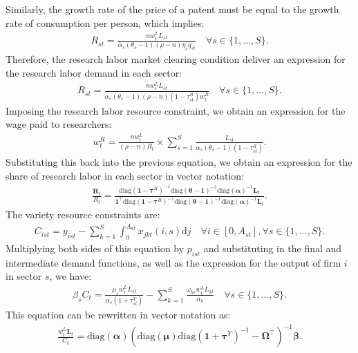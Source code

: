 \documentclass[12pt]{article}
\begin{document}
\clearpage

Similarly, the growth rate of the price of a patent must be equal to the growth rate of consumption per person, which implies:
\begin{align*}
R_{st} = \frac{n w_t^L L_{st}}{\alpha_s (\theta_s - 1) (\rho - n) \eta_s q_{st}} \quad \forall s \in \{1, \ldots, S\}.
\end{align*}
Therefore, the research labor market clearing condition deliver an expression for the research labor demand in each sector:
\begin{align*}
R_{st} = \frac{n w_t^L L_{st}}{\alpha_s (\theta_s - 1) (\rho - n) (1 - \tau_{st}^R) w_t^R} \quad \forall s \in \{1, \ldots, S\}.
\end{align*}
Imposing the research labor resource constraint, we obtain an expression for the wage paid to researchers:
\begin{align*}
w_t^R = \frac{n w_t^L}{(\rho - n) R_t} \times \sum_{s = 1}^S \frac{L_{st}}{\alpha_s (\theta_s - 1) (1 - \tau_{st}^R)}.
\end{align*}
Substituting this back into the previous equation, we obtain an expression for the share of research labor in each sector in vector notation:
\begin{align*}
\frac{\mathbf{R}_t}{R_t} = \frac{\text{diag}(\mathbf{1} - \bm{\tau}^R)^{-1} \text{diag}(\bm{\theta} - \mathbf{1})^{-1} \text{diag}(\bm{\alpha})^{-1} \mathbf{L}_t}{\mathbf{1}^{\top} \text{diag}(\mathbf{1} - \bm{\tau}^R)^{-1} \text{diag}(\bm{\theta} - \mathbf{1})^{-1} \text{diag}(\bm{\alpha})^{-1} \mathbf{L}_t}.
\end{align*}
The variety resource constraints are:
\begin{align*}
C_{ist} = y_{ist} - \sum_{k = 1}^S \int_0^{A_{kt}} x_{jkt}(i, s) \text{d}j \quad \forall i \in [0, A_{st}], \forall s \in \{1, \ldots, S\}.
\end{align*}
Multiplying both sides of this equation by $p_{ist}$ and substituting in the final and intermediate demand functions, as well as the expression for the output of firm $i$ in sector $s$, we have:
\begin{align*}
\beta_s C_t = \frac{\mu_s w_t^L L_{st}}{\alpha_s (1 + \tau_{st}^Y)} - \sum_{k = 1} ^S \frac{\omega_{ks} w_t^L L_{kt}}{\alpha_k} \quad \forall s \in \{1, \ldots, S\}.
\end{align*}
This equation can be rewritten in vector notation as:
\begin{align*}
\frac{w_t^L \mathbf{L}_t}{C_t} = \text{diag}(\bm{\alpha}) (\text{diag}(\bm{\mu}) \text{diag}(\mathbf{1} + \bm{\tau}^Y)^{-1} - \bm{\Omega}^{\top})^{-1} \bm{\beta}.
\end{align*}
\end{document}
